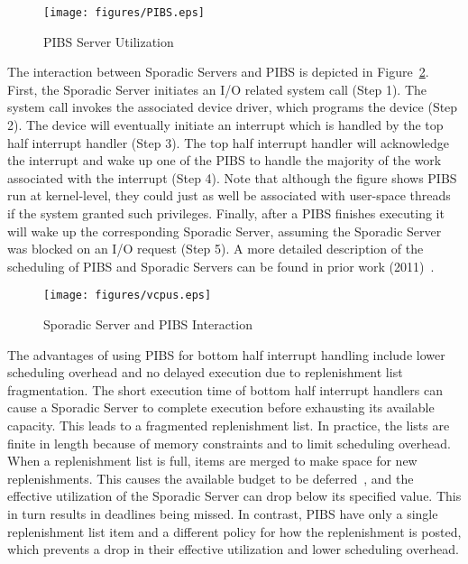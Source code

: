 \begin{figure}[h]
  \centering
  \texttt{[image: figures/PIBS.eps]}
  \caption{PIBS Server Utilization}
  \label{fig:PIBS}
\end{figure}

The interaction between Sporadic Servers and PIBS is depicted in
Figure~\ref{fig:vcpus}.  First, the Sporadic Server initiates an I/O related
system call (Step 1).  The system call invokes the associated device driver,
which programs the device (Step 2).  The device will eventually initiate an
interrupt which is handled by the top half interrupt handler (Step 3).  The
top half interrupt handler will acknowledge the interrupt and wake up one of
the PIBS to handle the majority of the work associated with the interrupt
(Step 4).  Note that although the figure shows PIBS run at kernel-level, they
could just as well be associated with user-space threads if the system granted
such privileges.  Finally, after a PIBS finishes executing it will wake up the
corresponding Sporadic Server, assuming the Sporadic Server was blocked on an
I/O request (Step 5).  A more detailed description of the scheduling of PIBS
and Sporadic Servers can be found in prior work (2011)~\cite{DanishLiWe11}.

\begin{figure}[h]
  \vspace{0.1in}
  \centering
  \texttt{[image: figures/vcpus.eps]}
  \vspace{0.1in}
  \caption{Sporadic Server and PIBS Interaction}
  \label{fig:vcpus}
  \vspace{-0.3in}
\end{figure}

The advantages of using PIBS for bottom half interrupt handling include lower
scheduling overhead and no delayed execution due to replenishment list
fragmentation.  The short execution time of bottom half interrupt handlers can
cause a Sporadic Server to complete execution before exhausting its available
capacity. This leads to a fragmented replenishment list. In practice, the lists
are finite in length because of memory constraints and to limit scheduling
overhead. When a replenishment list is full, items are merged to make space for
new replenishments. This causes the available budget to be
deferred~\cite{StanovichBaWa10}, and the effective utilization of the Sporadic
Server can drop below its specified value. This in turn results in deadlines
being missed.  In contrast, PIBS have only a single replenishment list item and
a different policy for how the replenishment is posted, which prevents a drop in
their effective utilization and lower scheduling overhead.

